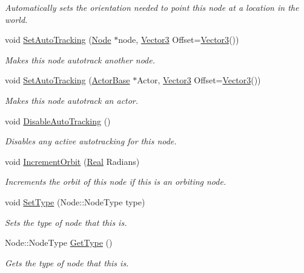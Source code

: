 \begin{DoxyCompactItemize}
\begin{DoxyCompactList}\small\item\em Automatically sets the orientation needed to point this node at a location in the world. \item\end{DoxyCompactList}\item 
void \hyperlink{classphys_1_1Node_a0e652a52ea7d6e18280d1fc4b283c86a}{SetAutoTracking} (\hyperlink{classphys_1_1Node}{Node} $\ast$node, \hyperlink{classphys_1_1Vector3}{Vector3} Offset=\hyperlink{classphys_1_1Vector3}{Vector3}())
\begin{DoxyCompactList}\small\item\em Makes this node autotrack another node. \item\end{DoxyCompactList}\item 
void \hyperlink{classphys_1_1Node_adc570391b491821a13b58e15e0dc2cac}{SetAutoTracking} (\hyperlink{classphys_1_1ActorBase}{ActorBase} $\ast$Actor, \hyperlink{classphys_1_1Vector3}{Vector3} Offset=\hyperlink{classphys_1_1Vector3}{Vector3}())
\begin{DoxyCompactList}\small\item\em Makes this node autotrack an actor. \item\end{DoxyCompactList}\item 
\hypertarget{classphys_1_1Node_a5571ede65a6edf20788700b5d408bf04}{
void \hyperlink{classphys_1_1Node_a5571ede65a6edf20788700b5d408bf04}{DisableAutoTracking} ()}
\label{d0/ddc/classphys_1_1Node_a5571ede65a6edf20788700b5d408bf04}

\begin{DoxyCompactList}\small\item\em Disables any active autotracking for this node. \item\end{DoxyCompactList}\item 
void \hyperlink{classphys_1_1Node_a93fbb2b20f3cab180f7bdd39299c252e}{IncrementOrbit} (\hyperlink{namespacephys_af7eb897198d265b8e868f45240230d5f}{Real} Radians)
\begin{DoxyCompactList}\small\item\em Increments the orbit of this node if this is an orbiting node. \item\end{DoxyCompactList}\item 
void \hyperlink{classphys_1_1Node_afbc58e8c751f617c89a2246c397c679e}{SetType} (Node::NodeType type)
\begin{DoxyCompactList}\small\item\em Sets the type of node that this is. \item\end{DoxyCompactList}\item 
Node::NodeType \hyperlink{classphys_1_1Node_aee8632b4db2accd810afd096247252c2}{GetType} ()
\begin{DoxyCompactList}\small\item\em Gets the type of node that this is. \item\end{DoxyCompactList}\end{DoxyCompactItemize}
